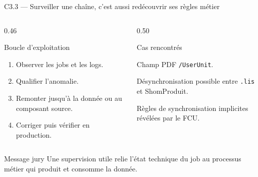\begin{frame}{C3.3 — Surveiller une chaîne, c'est aussi redécouvrir ses règles métier}
\begin{columns}[T]
\begin{column}{0.46\linewidth}
\begin{block}{Boucle d'exploitation}
\begin{enumerate}
  \item Observer les jobs et les logs.
  \item Qualifier l'anomalie.
  \item Remonter jusqu'à la donnée ou au composant source.
  \item Corriger puis vérifier en production.
\end{enumerate}
\end{block}
\end{column}
\begin{column}{0.50\linewidth}
\begin{block}{Cas rencontrés}
\begin{tightitems}
  \item Champ PDF \texttt{/UserUnit}.
  \item Désynchronisation possible entre \texttt{.lis} et ShomProduit.
  \item Règles de synchronisation implicites révélées par le FCU.
\end{tightitems}
\end{block}
\end{column}
\end{columns}
\begin{block}{Message jury}
Une supervision utile relie l'état technique du job au processus métier qui produit et consomme la donnée.
\end{block}
\end{frame}

